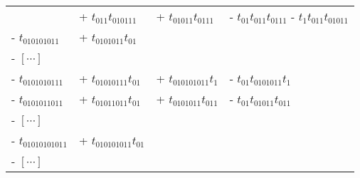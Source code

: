 \begin{table}
\begin{tabular}{llll}
 & + $t_{011} t_{010111}$ &  +
             $t_{01011} t_{0111}$& -  $t_{01} t_{011} t_{0111}$ -  $t_1 t_{011} t_{01011}$ \\
- $t_{010101011}$ &  + $t_{0101011} t_{01}$ & & \\
- $[\cdots]$ & & & \\ \hline
- $t_{0101010111}$ &  + $t_{01010111} t_{01}$ &  +
$t_{010101011} t_1$& -  $t_{01} t_{0101011} t_1$  \\
- $t_{0101011011}$ &  + $t_{01011011} t_{01}$&  +
$t_{0101011} t_{011}$ & -  $t_{01} t_{01011} t_{011}$  \\
- $[\cdots]$ & & & \\     \hline
- $t_{01010101011}$ &  + $t_{010101011} t_{01}$ & & \\
- $[\cdots]$ & & & \\
%
\end{tabular}
\renewcommand{\arraystretch}{1.0}
\label{t-mal-2GM}
\end{table}
